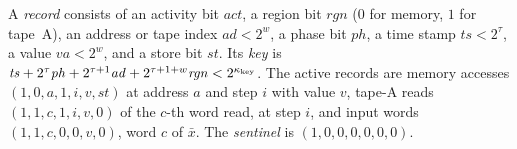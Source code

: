 \begin{definition}\label{earlier:r:def:event-trace}
A \emph{record} consists of an activity bit \(\mathit{act}\), a region
bit \(\mathit{rgn}\) (\(0\) for memory, \(1\) for tape~A), an address or
tape index \(\mathit{ad}<2^w\), a phase bit \(\mathit{ph}\), a time stamp
\(\mathit{ts}<2^\tau\), a value \(\mathit{va}<2^w\), and a store bit
\(\mathit{st}\). Its \emph{key} is
\(\mathit{ts}+2^\tau\mathit{ph}+2^{\tau+1}\mathit{ad}
+2^{\tau+1+w}\mathit{rgn}<2^{\kappa_{\rm key}}\). The active records are memory
accesses \((1,0,a,1,i,v,\mathit{st})\) at address \(a\) and step \(i\)
with value \(v\), tape-A reads \((1,1,c,1,i,v,0)\) of the \(c\)-th word
read, at step \(i\), and input words \((1,1,c,0,0,v,0)\), word \(c\) of
\(\bar x\). The \emph{sentinel} is \((1,0,0,0,0,0,0)\).


\end{definition}

